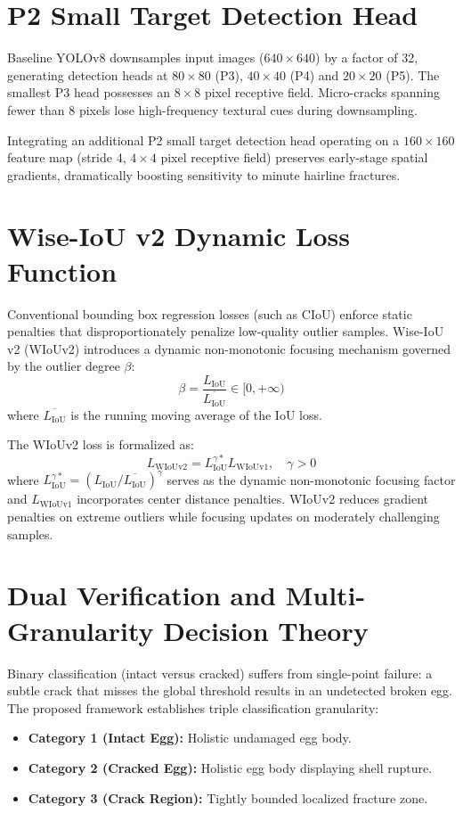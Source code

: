 \documentclass[12pt,a4paper]{report}
\begin{document}
\section{P2 Small Target Detection Head}

Baseline YOLOv8 downsamples input images ($640 \times 640$) by a factor of 32, generating detection heads at $80 \times 80$ (P3), $40 \times 40$ (P4) and $20 \times 20$ (P5). The smallest P3 head possesses an $8 \times 8$ pixel receptive field. Micro-cracks spanning fewer than 8 pixels lose high-frequency textural cues during downsampling.

Integrating an additional P2 small target detection head operating on a $160 \times 160$ feature map (stride 4, $4 \times 4$ pixel receptive field) preserves early-stage spatial gradients, dramatically boosting sensitivity to minute hairline fractures.

\section{Wise-IoU v2 Dynamic Loss Function}

Conventional bounding box regression losses (such as CIoU) enforce static penalties that disproportionately penalize low-quality outlier samples. Wise-IoU v2 (WIoUv2) introduces a dynamic non-monotonic focusing mechanism governed by the outlier degree $\beta$:
\begin{equation}
\beta = \frac{L_{\text{IoU}}}{\overline{L_{\text{IoU}}}} \in [0, +\infty)
\end{equation}
where $\overline{L_{\text{IoU}}}$ is the running moving average of the IoU loss.

The WIoUv2 loss is formalized as:
\begin{equation}
L_{\text{WIoUv2}} = L_{\text{IoU}}^{\gamma*} L_{\text{WIoUv1}}, \quad \gamma > 0
\end{equation}
where $L_{\text{IoU}}^{\gamma*} = (L_{\text{IoU}} / \overline{L_{\text{IoU}}})^\gamma$ serves as the dynamic non-monotonic focusing factor and $L_{\text{WIoUv1}}$ incorporates center distance penalties. WIoUv2 reduces gradient penalties on extreme outliers while focusing updates on moderately challenging samples.

\section{Dual Verification and Multi-Granularity Decision Theory}

Binary classification (intact versus cracked) suffers from single-point failure: a subtle crack that misses the global threshold results in an undetected broken egg. The proposed framework establishes triple classification granularity:
\begin{itemize}
    \item \textbf{Category 1 (Intact Egg):} Holistic undamaged egg body.
    \item \textbf{Category 2 (Cracked Egg):} Holistic egg body displaying shell rupture.
    \item \textbf{Category 3 (Crack Region):} Tightly bounded localized fracture zone.
\end{itemize}
\end{document}
